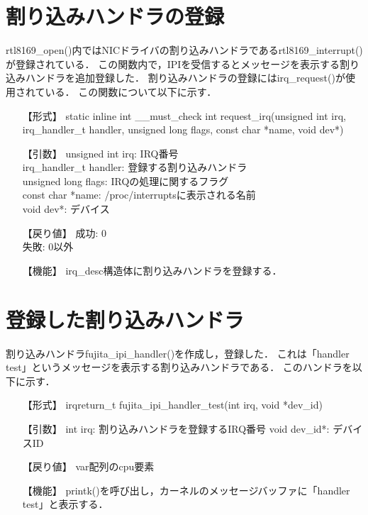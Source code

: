\documentclass[12pt]{jsarticle}
\begin{document}
\section{割り込みハンドラの登録}
rtl8169\_open()内ではNICドライバの割り込みハンドラであるrtl8169\_interrupt()が登録されている．
この関数内で，IPIを受信するとメッセージを表示する割り込みハンドラを追加登録した．
割り込みハンドラの登録にはirq\_request()が使用されている．
この関数について以下に示す．
\begin{itemize}
\item [【形式】] static inline int \_\_must\_check int request\_irq(unsigned int irq, irq\_handler\_t handler, unsigned long flags,
 const char *name, void dev*)
\item [【引数】] unsigned int irq: IRQ番号\\
irq\_handler\_t handler: 登録する割り込みハンドラ\\
unsigned long flags: IRQの処理に関するフラグ\\
const char *name: /proc/interruptsに表示される名前\\
void dev*: デバイス
\item [【戻り値】] 成功: 0\\失敗: 0以外
\item [【機能】] irq\_desc構造体に割り込みハンドラを登録する．
\end{itemize}


\section{登録した割り込みハンドラ}
割り込みハンドラfujita\_ipi\_handler()を作成し，登録した．
これは「handler test」というメッセージを表示する割り込みハンドラである．
このハンドラを以下に示す．
\begin{itemize}
\item [【形式】] irqreturn\_t fujita\_ipi\_handler\_test(int irq, void *dev\_id)
\item [【引数】] int irq: 割り込みハンドラを登録するIRQ番号
void dev\_id*: デバイスID
\item [【戻り値】] var配列のcpu要素
\item [【機能】] printk()を呼び出し，カーネルのメッセージバッファに「handler test」と表示する．
\end{itemize}
\end{document}
